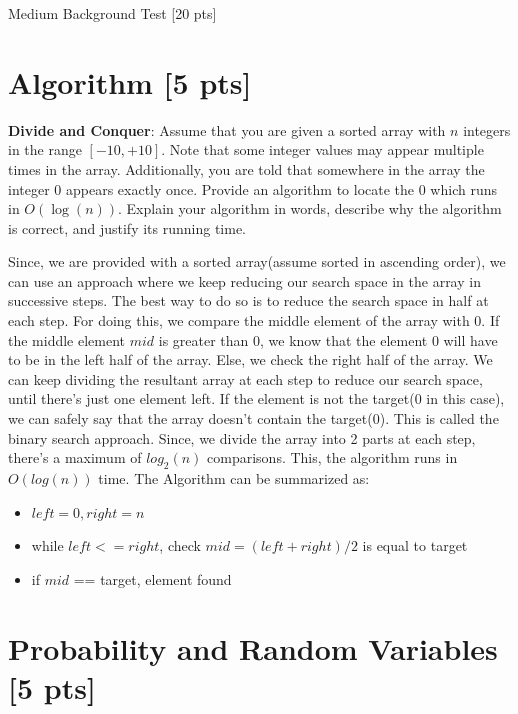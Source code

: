 \documentclass[a4paper]{article}
\theoremstyle{definition}
\newenvironment{soln}{
    \leavevmode\color{blue}\ignorespaces
}{}
\begin{document}
\clearpage  %


\begin{center}
\Huge
Medium Background Test [20 pts]
\end{center}

\section{Algorithm [5 pts]}
\textbf{Divide and Conquer}: Assume that you are given a sorted array
with $n$ integers in the range $[-10, +10]$. Note that some integer values
may appear multiple times in the array. Additionally, you are
told that somewhere in the array the integer $0$ appears exactly once. Provide an
algorithm to locate the $0$ which runs in $O(\log(n))$. Explain your
algorithm in words, describe why the algorithm is correct, and justify
its running time.\\

\begin{soln}  

Since, we are provided with a sorted array(assume sorted in ascending order), we can use an approach where we keep reducing our search space in the array in successive steps. The best way to do so is to reduce the search space in half at each step. For doing this, we compare the middle element of the array with 0. If the middle element $mid$ is greater than 0, we know that the element 0 will have to be in the left half of the array. Else, we check the right half of the array. We can keep dividing the resultant array at each step to reduce our search space, until there's just one element left. If the element is not the target(0 in this case), we can safely say that the array doesn't contain the target(0). This is called the binary search approach. Since, we divide the array into 2 parts at each step, there's a maximum of $log_2(n)$ comparisons. This, the algorithm runs in $O(log(n))$ time. The Algorithm can be summarized as:
\begin{itemize}
	\item $left = 0, right = n$
	\item while $left <= right$, check $mid = (left+right) / 2$ is equal to target
	\item \hspace{0.4cm} if $mid$ == target, element found

\end{itemize}
\end{soln}

\section{Probability and Random Variables [5 pts]}
\end{document}
